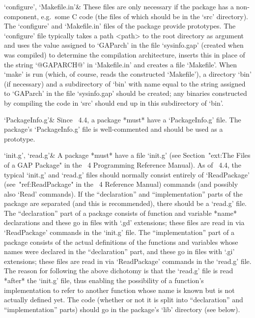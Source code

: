 `configure', `Makefile.in'&
These files are only necessary if the package has a non-{\GAP} component,
e.g.~some C code (the files of which should be in the  `src'  directory).
The `configure' and `Makefile.in' files of the {\Example} package provide
prototypes. The `configure' file typically takes a  path  <path>  to  the
{\GAP} root  directory  as  argument  and  uses  the  value  assigned  to
`GAParch' in the file `sysinfo.gap' (created when {\GAP} was compiled) to
determine the compilation architecture, inserts  this  in  place  of  the
string `@GAPARCH@' in `Makefile.in' and creates a file  `Makefile'.  When
`make' is run (which, of course, reads  the  constructed  `Makefile'),  a
directory `bin' (if necessary) and a  subdirectory  of  `bin'  with  name
equal to the string assigned  to  `GAParch'  in  the  file  `sysinfo.gap'
should be created; any binaries constructed  by  compiling  the  code  in
`src' should end up in this subdirectory of `bin'.

`PackageInfo.g'&
Since {\GAP}~4.4, a {\GAP} package *must* have  a  `PackageInfo.g'  file.
The {\Example}  package's  `PackageInfo.g'  file  is  well-commented  and
should be used as a prototype.

`init.g', `read.g'&
A {\GAP} package *must* have a file `init.g' (see Section~"ext:The  Files
of a GAP Package" in the {\GAP}~4 Programming Reference  Manual).  As  of
{\GAP}~4.4, the typical  `init.g'  and  `read.g'  files  should  normally
consist entirely of `ReadPackage' (see~"ref:ReadPackage" in the  {\GAP}~4
Reference Manual) commands (and possibly also `Read'  commands).  If  the
``declaration'' and ``implementation'' parts of the package are separated
(and  this  is  recommended),  there  should  be  a  `read.g'  file.  The
``declaration'' part of a  package  consists  of  function  and  variable
*name* declarations and these go in files with  `.gd'  extensions;  these
files are read in via `ReadPackage' commands in the  `init.g'  file.  The
``implementation'' part of a package consists of the  actual  definitions
of  the  functions  and  variables  whose  names  were  declared  in  the
``declaration'' part, and these go in files with `.gi' extensions;  these
files are read in via `ReadPackage' commands in the  `read.g'  file.  The
reason for following the above dichotomy is that  the  `read.g'  file  is
read *after* the `init.g'  file,  thus  enabling  the  possibility  of  a
function's implementation to refer to  another  function  whose  name  is
known but is not actually defined yet. The {\GAP} code (whether or not it
is split into ``declaration'' and ``implementation'' parts) should go  in
the package's `lib' directory (see below).

